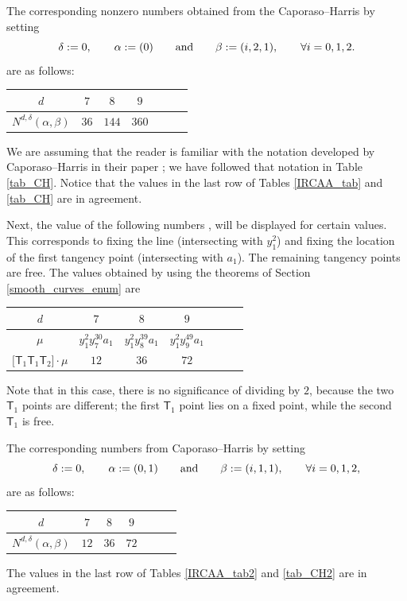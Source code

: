 \documentclass[pdftex]{sigma}
\numberwithin{equation}{section}
\begin{document}
The corresponding nonzero numbers obtained from the Caporaso--Harris
by setting
\[\delta := 0, \qquad \alpha := (0) \qquad \textnormal{and} \qquad \beta := (i, 2, 1), \qquad \forall i = 0, 1, 2.\]
are as follows:
\begin{center}\renewcommand{\arraystretch}{1.2}
\begin{tabular}{|c|c|c|c|c|c|c|}
\hline
$d$ & $7$ & $8$ & $9$ \\
\hline
$N^{d,\delta}(\alpha, \beta)$
 & $36$ & $144$ & $360$ \\
\hline
\end{tabular}
\label{tab_CH}
\end{center}
We are assuming that the reader is familiar with the notation developed by
Caporaso--Harris in their paper \cite{CH}; we have followed that notation
in Table \ref{tab_CH}. Notice that the values in the last row of Tables \ref{IRCAA_tab} and \ref{tab_CH}
are in agreement.

Next, the value of the following numbers
,
will be displayed for certain values. This corresponds to fixing the line (intersecting with $y_1^2$)
and fixing the location of the first tangency point (intersecting with $a_1$). The remaining tangency points
are free. The values obtained by
using the theorems of Section \ref{smooth_curves_enum} are
\begin{center}\renewcommand{\arraystretch}{1.2}
\begin{tabular}{|c|c|c|c|c|c|c|}
\hline
$d$ & $7$ & $8$ & $9$ \\
\hline
$\mu$ & $y_1^2 y_7^{30}a_1$ & $y_1^2 y_8^{39}a_1$ & $y_1^2 y_9^{49}a_1$ \\
\hline
$\bigl[\mathsf{T}_{1} \mathsf{T}_{1} \mathsf{T}_{2}\bigr] \cdot \mu$ & $12$ & $36$ & $72$ \\
\hline
\end{tabular}
\label{IRCAA_tab2}
\end{center}


Note that in this case, there is no significance of dividing by $2$, because the two $\mathsf{T}_1$ points
are different; the first $\mathsf{T}_1$ point lies on a fixed point, while the second $\mathsf{T}_1$ is free.

The corresponding numbers from Caporaso--Harris
by setting
\[\delta:= 0, \qquad \alpha:= (0,1) \qquad \textnormal{and} \qquad \beta:=(i,1,1),\qquad \forall i=0,1,2,\]
are as follows:
\begin{center}\renewcommand{\arraystretch}{1.2}
\begin{tabular}{|c|c|c|c|c|c|c|}
\hline
$d$ & $7$ & $8$ & $9$ \\
\hline
$N^{d,\delta}(\alpha, \beta)$ & $12$ & $36$ & $72$ \\
\hline
\end{tabular}
 \label{tab_CH2}
\end{center}
The values in the last row of Tables \ref{IRCAA_tab2} and \ref{tab_CH2}
are in agreement.
\end{document}
